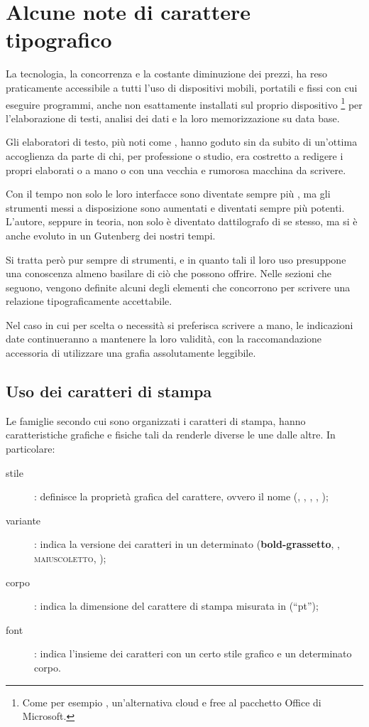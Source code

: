 					\section{Alcune note di carattere tipografico}
					
La tecnologia, la concorrenza e la costante diminuzione dei prezzi, ha reso praticamente accessibile a tutti l'uso di dispositivi mobili, portatili e fissi con cui eseguire programmi, anche non esattamente installati sul proprio dispositivo%
			\footnote{Come per esempio , un'alternativa cloud e free al pacchetto Office di Microsoft.}
per l'elaborazione di testi, analisi dei dati e la loro memorizzazione su data base.

Gli elaboratori di testo, più noti come , hanno goduto sin da subito di un'ottima accoglienza da parte di chi, per professione o studio, era costretto a redigere i propri elaborati o a mano o con una vecchia e rumorosa macchina da scrivere.

Con il tempo non solo le loro interfacce sono diventate sempre più , ma gli strumenti messi a disposizione sono aumentati e diventati sempre più potenti. L'autore, seppure in teoria, non solo è diventato dattilografo di se stesso, ma si è anche evoluto in un Gutenberg dei nostri tempi.

Si tratta però pur sempre di strumenti, e in quanto tali il loro uso presuppone una conoscenza almeno basilare di ciò che possono offrire. Nelle sezioni che seguono, vengono definite alcuni degli elementi che concorrono per scrivere una relazione tipograficamente accettabile.

Nel caso in cui per scelta o necessità si preferisca scrivere a mano, le indicazioni date continueranno a mantenere la loro validità, con la raccomandazione accessoria di utilizzare una grafia assolutamente leggibile.


								\subsection{Uso dei caratteri di stampa}
								
Le famiglie secondo cui sono organizzati i caratteri di stampa, hanno caratteristiche grafiche e fisiche tali da renderle diverse le une dalle altre. In particolare:
\begin{description}
 \item[stile]: definisce la proprietà grafica del carattere, ovvero il nome (, , , , \ecc);
 \item[variante]: indica la versione dei caratteri in un determinato  (\textbf{bold-grassetto}, , \textsc{maiuscoletto}, \ecc);
 \item[corpo]: indica la dimensione del carattere di stampa misurata in  (``pt'');
 \item[font]: indica l'insieme dei caratteri con un certo stile grafico e un determinato corpo.
\end{description}


